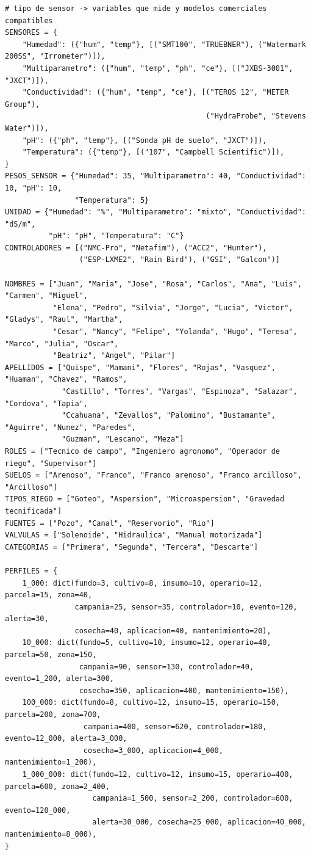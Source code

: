 \documentclass[11pt,letterpaper]{article}
\begin{document}
\begin{lstlisting}[style=py]
# tipo de sensor -> variables que mide y modelos comerciales compatibles
SENSORES = {
    "Humedad": ({"hum", "temp"}, [("SMT100", "TRUEBNER"), ("Watermark 200SS", "Irrometer")]),
    "Multiparametro": ({"hum", "temp", "ph", "ce"}, [("JXBS-3001", "JXCT")]),
    "Conductividad": ({"hum", "temp", "ce"}, [("TEROS 12", "METER Group"),
                                              ("HydraProbe", "Stevens Water")]),
    "pH": ({"ph", "temp"}, [("Sonda pH de suelo", "JXCT")]),
    "Temperatura": ({"temp"}, [("107", "Campbell Scientific")]),
}
PESOS_SENSOR = {"Humedad": 35, "Multiparametro": 40, "Conductividad": 10, "pH": 10,
                "Temperatura": 5}
UNIDAD = {"Humedad": "%", "Multiparametro": "mixto", "Conductividad": "dS/m",
          "pH": "pH", "Temperatura": "C"}
CONTROLADORES = [("NMC-Pro", "Netafim"), ("ACC2", "Hunter"),
                 ("ESP-LXME2", "Rain Bird"), ("GSI", "Galcon")]

NOMBRES = ["Juan", "Maria", "Jose", "Rosa", "Carlos", "Ana", "Luis", "Carmen", "Miguel",
           "Elena", "Pedro", "Silvia", "Jorge", "Lucia", "Victor", "Gladys", "Raul", "Martha",
           "Cesar", "Nancy", "Felipe", "Yolanda", "Hugo", "Teresa", "Marco", "Julia", "Oscar",
           "Beatriz", "Angel", "Pilar"]
APELLIDOS = ["Quispe", "Mamani", "Flores", "Rojas", "Vasquez", "Huaman", "Chavez", "Ramos",
             "Castillo", "Torres", "Vargas", "Espinoza", "Salazar", "Cordova", "Tapia",
             "Ccahuana", "Zevallos", "Palomino", "Bustamante", "Aguirre", "Nunez", "Paredes",
             "Guzman", "Lescano", "Meza"]
ROLES = ["Tecnico de campo", "Ingeniero agronomo", "Operador de riego", "Supervisor"]
SUELOS = ["Arenoso", "Franco", "Franco arenoso", "Franco arcilloso", "Arcilloso"]
TIPOS_RIEGO = ["Goteo", "Aspersion", "Microaspersion", "Gravedad tecnificada"]
FUENTES = ["Pozo", "Canal", "Reservorio", "Rio"]
VALVULAS = ["Solenoide", "Hidraulica", "Manual motorizada"]
CATEGORIAS = ["Primera", "Segunda", "Tercera", "Descarte"]

PERFILES = {
    1_000: dict(fundo=3, cultivo=8, insumo=10, operario=12, parcela=15, zona=40,
                campania=25, sensor=35, controlador=10, evento=120, alerta=30,
                cosecha=40, aplicacion=40, mantenimiento=20),
    10_000: dict(fundo=5, cultivo=10, insumo=12, operario=40, parcela=50, zona=150,
                 campania=90, sensor=130, controlador=40, evento=1_200, alerta=300,
                 cosecha=350, aplicacion=400, mantenimiento=150),
    100_000: dict(fundo=8, cultivo=12, insumo=15, operario=150, parcela=200, zona=700,
                  campania=400, sensor=620, controlador=180, evento=12_000, alerta=3_000,
                  cosecha=3_000, aplicacion=4_000, mantenimiento=1_200),
    1_000_000: dict(fundo=12, cultivo=12, insumo=15, operario=400, parcela=600, zona=2_400,
                    campania=1_500, sensor=2_200, controlador=600, evento=120_000,
                    alerta=30_000, cosecha=25_000, aplicacion=40_000, mantenimiento=8_000),
}



\end{lstlisting}
\end{document}

